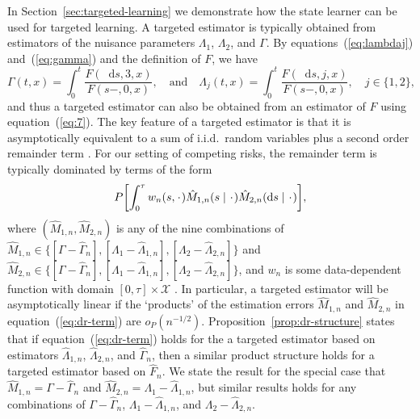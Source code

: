 \documentclass{statsoc}
\numberwithin{theorem}{section}
\newcommand{\blank}{\makebox[1ex]{\textbf{$\cdot$}}}
\newcommand*\diff{\mathop{}\!\mathrm{d}}
\newcommand\smallO{\textit{o}}
\newcommand{\1}{\mathds{1}}
\begin{document}
In Section~\ref{sec:targeted-learning} we demonstrate how the state learner can
be used for targeted learning. A targeted estimator is typically obtained from
estimators of the nuisance parameters $\Lambda_1$, $\Lambda_2$, and $\Gamma$. By
equations~(\ref{eq:lambdaj}) and~(\ref{eq:gamma}) and the definition of \( F \),
we have
\begin{equation}
  \label{eq:7}
  \Gamma(t , x) 
  = \int_0^t  \frac{F(\diff s, 3, x )}{F(s-, 0, x )},
  \quad \text{and} \quad
  \Lambda_j(t , x) 
  = \int_0^t  \frac{F(\diff s, j, x )}{F(s-, 0, x )},
  \quad j \in \{1,2\},
\end{equation}
and thus a targeted estimator can also be obtained from an estimator of $F$
using equation~(\ref{eq:7}). The key feature of a targeted estimator is that it
is asymptotically equivalent to a sum of i.i.d.\ random variables plus a second
order remainder term \citep{bickel1993efficient,fisher2021visually}. For our
setting of competing risks, the remainder term is typically dominated by terms
of the form
\begin{equation}
  \label{eq:dr-term}
  P{\left[
      \int_0^{\tau} w_n(s, \blank)
      \hat{M}_{1,n}(s \mid  \blank)
      \hat{M}_{2,n}(\diff s \mid  \blank)
    \right]},
\end{equation}
where \( (\hat{M}_{1,n}, \hat{M}_{2,n}) \) is any of the nine combinations of
\( \hat{M}_{1,n} \in \{[\Gamma -\hat{\Gamma}_n], [\Lambda_1
-\hat{\Lambda}_{1,n}], [\Lambda_2 -\hat{\Lambda}_{2,n}]\} \) and
\( \hat{M}_{2,n} \in \{[\Gamma -\hat{\Gamma}_n], [\Lambda_1
-\hat{\Lambda}_{1,n}], [\Lambda_2 -\hat{\Lambda}_{2,n}]\} \), and \( w_n \) is
some data-dependent function with domain \([0,\tau]\times\mathcal X \)
\citep{van2003unified}. In particular, a targeted estimator will be
asymptotically linear if the `products' of the estimation errors
\( \hat{M}_{1,n} \) and \( \hat{M}_{2,n} \) in equation~(\ref{eq:dr-term}) are
\( \smallO_P{(n^{-1/2})}\). Proposition~\ref{prop:dr-structure} states that if
equation~(\ref{eq:dr-term}) holds for the a targeted estimator based on
estimators $\hat{\Lambda}_{1,n}$, $\hat{\Lambda}_{2,n}$, and $\hat{\Gamma}_{n}$,
then a similar product structure holds for a targeted estimator based on
\( \hat{F}_n \). We state the result for the special case that
\(\hat{M}_{1,n}= \Gamma-\hat{\Gamma}_n \) and
\(\hat{M}_{2,n} =\Lambda_1-\hat{\Lambda}_{1,n} \), but similar results holds for
any combinations of \( \Gamma-\hat{\Gamma}_n\),
\( \Lambda_1-\hat{\Lambda}_{1,n} \), and \( \Lambda_2-\hat{\Lambda}_{2,n} \).
\end{document}
